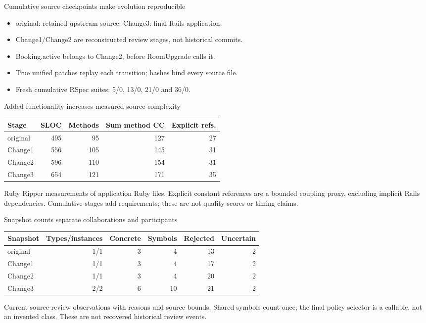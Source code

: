 \documentclass[aspectratio=169,11pt]{beamer}
\begin{document}
\begin{frame}{Cumulative source checkpoints make evolution reproducible}
\begin{itemize}
\item original: retained upstream source; Change3: final Rails application.
\item Change1/Change2 are reconstructed review stages, not historical commits.
\item Booking.active belongs to Change2, before RoomUpgrade calls it.
\item True unified patches replay each transition; hashes bind every source file.
\item Fresh cumulative RSpec suites: 5/0, 13/0, 21/0 and 36/0.
\end{itemize}
\end{frame}
\begin{frame}{Added functionality increases measured source complexity}
\centering
\begin{tabular}{lrrrr}
\toprule Stage & SLOC & Methods & Sum method CC & Explicit refs.\\\midrule
original & 495 & 95 & 127 & 27\\
Change1 & 556 & 105 & 145 & 31\\
Change2 & 596 & 110 & 154 & 31\\
Change3 & 654 & 121 & 171 & 35\\\bottomrule
\end{tabular}\par
\vspace{0.3cm}\raggedright
Ruby Ripper measurements of application Ruby files. Explicit constant references are a bounded coupling proxy, excluding implicit Rails dependencies. Cumulative stages add requirements; these are not quality scores or timing claims.
\end{frame}
\begin{frame}{Snapshot counts separate collaborations and participants}
\centering
\begin{tabular}{lrrrrr}
\toprule Snapshot & Types/instances & Concrete & Symbols & Rejected & Uncertain\\\midrule
original & 1/1 & 3 & 4 & 13 & 2\\
Change1 & 1/1 & 3 & 4 & 17 & 2\\
Change2 & 1/1 & 3 & 4 & 20 & 2\\
Change3 & 2/2 & 6 & 10 & 21 & 2\\\bottomrule
\end{tabular}\par
\vspace{0.3cm}\raggedright
Current source-review observations with reasons and source bounds. Shared symbols count once; the final policy selector is a callable, not an invented class. These are not recovered historical review events.
\end{frame}
\end{document}
